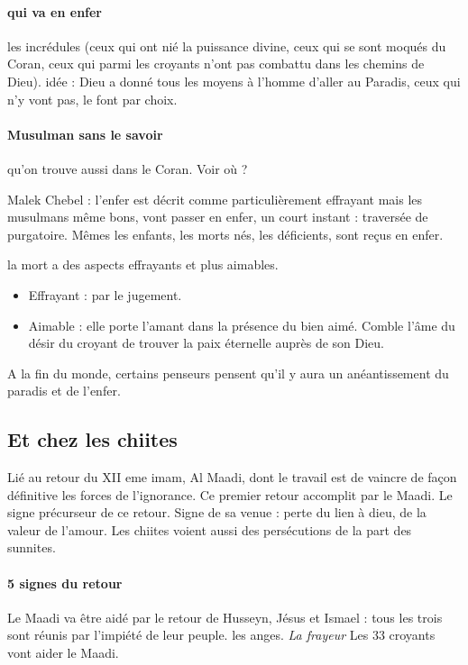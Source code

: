 \paragraph{qui va en enfer} les incrédules (ceux qui ont nié la puissance divine, ceux qui se sont moqués du Coran, ceux qui parmi les croyants n'ont pas combattu dans les chemins de Dieu). idée : Dieu a donné tous les moyens à l'homme d'aller au Paradis, ceux qui n'y vont pas, le font par choix.

\paragraph{Musulman sans le savoir} qu'on trouve aussi dans le Coran. Voir où ?


Malek Chebel : l'enfer est décrit comme particulièrement effrayant mais les musulmans même bons, vont passer en enfer, un court instant : traversée de purgatoire. Mêmes les enfants, les morts nés, les déficients, sont reçus en enfer. 

\begin{Synthesis}
    la mort a des aspects effrayants et plus aimables.
    \begin{itemize}
        \item Effrayant : par le jugement. 
        \item Aimable : elle porte l'amant dans la présence du bien aimé. Comble l'âme du désir du croyant de trouver la paix éternelle auprès de son Dieu.
    \end{itemize}
\end{Synthesis}

A la fin du monde, certains penseurs pensent qu'il y aura un anéantissement du paradis et de l'enfer.

\subsection{Et chez les chiites} Lié au retour du XII eme imam, Al Maadi, dont le travail est de vaincre de façon définitive les forces de l'ignorance. 
Ce premier retour accomplit par le Maadi. Le signe précurseur de ce retour. Signe de sa venue : perte du lien à dieu, de la valeur de l'amour. Les chiites voient aussi des persécutions de la part des sunnites.

\paragraph{5 signes du retour } Le Maadi va être aidé par le retour de Husseyn, Jésus et Ismael : tous les trois sont réunis par l'impiété de leur peuple.
les anges. 
\textit{La frayeur}
Les 33 croyants
vont aider le Maadi. 